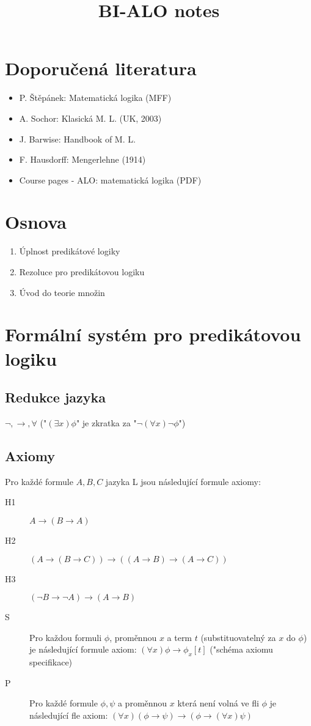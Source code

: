 \documentclass[a4paper]{article}
\title{BI-ALO notes}
\begin{document}
	\maketitle

	\section{Doporučená literatura}
	\begin{itemize}
		\item P. Štěpánek: Matematická logika (MFF)
		\item A. Sochor: Klasická M. L. (UK, 2003)
		\item J. Barwise: Handbook of M. L.
		\item F. Hausdorff: Mengerlehne (1914)
		\item Course pages - ALO: matematická logika (PDF)
	\end{itemize}

	\section{Osnova}
	\begin{enumerate}
		\item Úplnost predikátové logiky
		\item Rezoluce pro predikátovou logiku
		\item Úvod do teorie množin
	\end{enumerate}

	\section{Formální systém pro predikátovou logiku}
	\subsection{Redukce jazyka}
	$\neg, \to,  \forall$ ("$(\exists x) \phi$" je zkratka za "$\neg (\forall x) \neg \phi$")

	\subsection{Axiomy}
	Pro každé formule $A, B, C$ jazyka L jsou následující formule axiomy:
	\begin{description}
		\item[H1] $A \to (B \to A)$
		\item[H2] $(A \to (B \to C)) \to ((A \to B) \to (A \to C))$
		\item[H3] $(\neg B \to \neg A) \to (A \to B)$
		\item[S] Pro každou formuli $\phi$, proměnnou $x$ a term $t$ (substituovatelný za $x$ do $\phi$)
			je následující formule axiom: $(\forall x) \phi \to \phi_x[t]$ ("schéma axiomu specifikace)
		\item[P] Pro každé formule $\phi, \psi$ a proměnnou $x$ která není volná ve fli $\phi$ je
			následující fle axiom:  $(\forall x)(\phi \to \psi) \to (\phi \to (\forall x) \psi)$
	\end{description}
\end{document}

